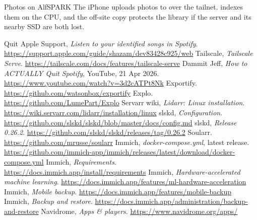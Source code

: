 \documentclass[11pt,a4paper]{article}
\begin{document}
\begin{result}{Photos on AlfSPARK}
The iPhone uploads photos to  over the tailnet.  indexes them on the CPU, and the off-site copy protects the library if the server and its nearby SSD are both lost.
\end{result}

\begin{thebibliography}{Quit}
   Apple Support, \textit{Listen to your identified songs in Spotify}. \url{https://support.apple.com/guide/shazam/dev83428c925/web}
   Tailscale, \textit{Tailscale Serve}. \url{https://tailscale.com/docs/features/tailscale-serve}
   Dammit Jeff, \textit{How to ACTUALLY Quit Spotify}, YouTube, 21 Apr 2026. \url{https://www.youtube.com/watch?v=3d2cATPt8Nk}
   Exportify. \url{https://github.com/watsonbox/exportify}
   Explo. \url{https://github.com/LumePart/Explo}
   Servarr wiki, \textit{Lidarr: Linux installation}. \url{https://wiki.servarr.com/lidarr/installation/linux}
   slskd, \textit{Configuration}. \url{https://github.com/slskd/slskd/blob/master/docs/config.md}
   slskd, \textit{Release 0.26.2}. \url{https://github.com/slskd/slskd/releases/tag/0.26.2}
   Soularr. \url{https://github.com/mrusse/soularr}
   Immich, \textit{docker-compose.yml}, latest release. \url{https://github.com/immich-app/immich/releases/latest/download/docker-compose.yml}
   Immich, \textit{Requirements}. \url{https://docs.immich.app/install/requirements}
   Immich, \textit{Hardware-accelerated machine learning}. \url{https://docs.immich.app/features/ml-hardware-acceleration}
   Immich, \textit{Mobile backup}. \url{https://docs.immich.app/features/mobile-backup}
   Immich, \textit{Backup and restore}. \url{https://docs.immich.app/administration/backup-and-restore}
   Navidrome, \textit{Apps \& players}. \url{https://www.navidrome.org/apps/}
\end{thebibliography}

\revisiontable
\end{document}
